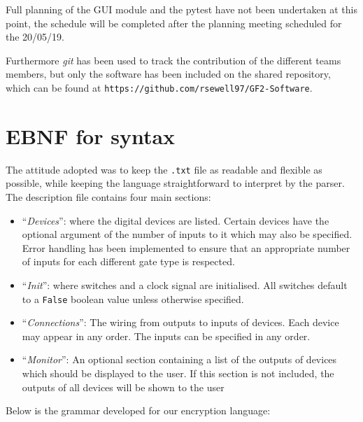 \documentclass[12pt]{article}
\begin{document}
Full planning of the GUI module and the pytest have not been undertaken at this point, the schedule will be completed after the planning meeting scheduled for the 20/05/19. 

Furthermore \textit{git} has been used to track the contribution of the different teams members, but only the software has been included on the shared repository, which can be found at \texttt{https://github.com/rsewell97/GF2-Software}.

 
\section{EBNF for syntax}

The attitude adopted was to keep the \texttt{.txt} file as readable and flexible as possible, while keeping the language straightforward to interpret by the parser. 
\\
The description file contains four main sections:
\begin{itemize}
\item “\textit{Devices}”: where the digital devices are listed.  Certain devices have the optional argument of the number of inputs to it which may also be specified. Error handling has been implemented to ensure that an appropriate number of inputs for each different gate type is respected. 
\item “\textit{Init}”: where switches and a clock signal are initialised. All switches default to a \texttt{False} boolean value unless otherwise specified.
\item “\textit{Connections}”: The wiring from outputs to inputs of devices. Each device may appear in any order. The inputs can be specified in any order.   
\item “\textit{Monitor}”: An optional section containing a list of the outputs of devices which should be displayed to the user. If this section is not included, the outputs of all devices will be shown to the user
\end{itemize}

Below is the grammar developed for our encryption language:
\end{document}
